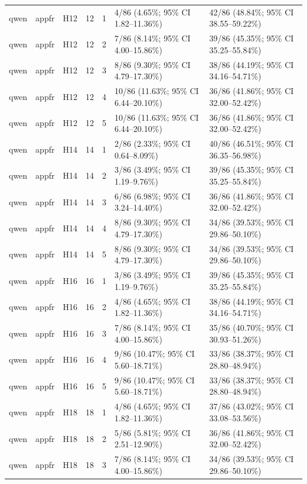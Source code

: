 \begin{longtable}{lllrrll}
qwen & appfr & H12 & 12 & 1 & 4/86 (4.65\%; 95\% CI 1.82–11.36\%) & 42/86 (48.84\%; 95\% CI 38.55–59.22\%) \\
qwen & appfr & H12 & 12 & 2 & 7/86 (8.14\%; 95\% CI 4.00–15.86\%) & 39/86 (45.35\%; 95\% CI 35.25–55.84\%) \\
qwen & appfr & H12 & 12 & 3 & 8/86 (9.30\%; 95\% CI 4.79–17.30\%) & 38/86 (44.19\%; 95\% CI 34.16–54.71\%) \\
qwen & appfr & H12 & 12 & 4 & 10/86 (11.63\%; 95\% CI 6.44–20.10\%) & 36/86 (41.86\%; 95\% CI 32.00–52.42\%) \\
qwen & appfr & H12 & 12 & 5 & 10/86 (11.63\%; 95\% CI 6.44–20.10\%) & 36/86 (41.86\%; 95\% CI 32.00–52.42\%) \\
qwen & appfr & H14 & 14 & 1 & 2/86 (2.33\%; 95\% CI 0.64–8.09\%) & 40/86 (46.51\%; 95\% CI 36.35–56.98\%) \\
qwen & appfr & H14 & 14 & 2 & 3/86 (3.49\%; 95\% CI 1.19–9.76\%) & 39/86 (45.35\%; 95\% CI 35.25–55.84\%) \\
qwen & appfr & H14 & 14 & 3 & 6/86 (6.98\%; 95\% CI 3.24–14.40\%) & 36/86 (41.86\%; 95\% CI 32.00–52.42\%) \\
qwen & appfr & H14 & 14 & 4 & 8/86 (9.30\%; 95\% CI 4.79–17.30\%) & 34/86 (39.53\%; 95\% CI 29.86–50.10\%) \\
qwen & appfr & H14 & 14 & 5 & 8/86 (9.30\%; 95\% CI 4.79–17.30\%) & 34/86 (39.53\%; 95\% CI 29.86–50.10\%) \\
qwen & appfr & H16 & 16 & 1 & 3/86 (3.49\%; 95\% CI 1.19–9.76\%) & 39/86 (45.35\%; 95\% CI 35.25–55.84\%) \\
qwen & appfr & H16 & 16 & 2 & 4/86 (4.65\%; 95\% CI 1.82–11.36\%) & 38/86 (44.19\%; 95\% CI 34.16–54.71\%) \\
qwen & appfr & H16 & 16 & 3 & 7/86 (8.14\%; 95\% CI 4.00–15.86\%) & 35/86 (40.70\%; 95\% CI 30.93–51.26\%) \\
qwen & appfr & H16 & 16 & 4 & 9/86 (10.47\%; 95\% CI 5.60–18.71\%) & 33/86 (38.37\%; 95\% CI 28.80–48.94\%) \\
qwen & appfr & H16 & 16 & 5 & 9/86 (10.47\%; 95\% CI 5.60–18.71\%) & 33/86 (38.37\%; 95\% CI 28.80–48.94\%) \\
qwen & appfr & H18 & 18 & 1 & 4/86 (4.65\%; 95\% CI 1.82–11.36\%) & 37/86 (43.02\%; 95\% CI 33.08–53.56\%) \\
qwen & appfr & H18 & 18 & 2 & 5/86 (5.81\%; 95\% CI 2.51–12.90\%) & 36/86 (41.86\%; 95\% CI 32.00–52.42\%) \\
qwen & appfr & H18 & 18 & 3 & 7/86 (8.14\%; 95\% CI 4.00–15.86\%) & 34/86 (39.53\%; 95\% CI 29.86–50.10\%) \\

\end{longtable}
